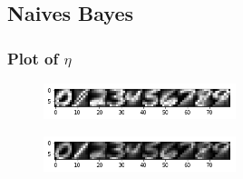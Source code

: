 \documentclass[letterpaper]{article}
\begin{document}
\subsection{Naives Bayes}
\subsubsection{Plot of $\eta$}
\begin{figure}[H]
\centering
\includegraphics[width=0.5\textwidth]{q3_eta.png}
\caption{\label{}}
\end{figure}


\begin{figure}[H]
\centering
\includegraphics[width=0.5\textwidth]{eta_plot.png}
\caption{\label{}}
\end{figure}






\end{document}

